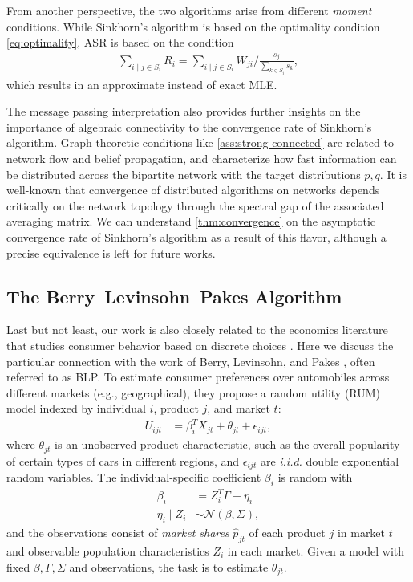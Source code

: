 From another perspective, the two algorithms arise from different \emph{moment} conditions. While Sinkhorn's algorithm is based on the optimality condition \eqref{eq:optimality}, ASR is based on the condition
\begin{align*}
    \sum_{i\mid j\in S_{i}} R_i = \sum_{i\mid j \in S_i}  W_{ji}/\frac{s_j}{\sum_{k\in S_{i}}s_{k}},
\end{align*}
which results in an approximate instead of exact MLE. 

The message passing interpretation also provides further insights on the importance of algebraic connectivity to the convergence rate of Sinkhorn's algorithm. Graph theoretic conditions like \cref{ass:strong-connected} are related to network flow and belief propagation, and characterize how fast information can be distributed across the bipartite network with the target distributions $p,q$. It is well-known that convergence of distributed algorithms on networks depends critically on the network topology through the spectral gap of the associated averaging matrix. We can understand \cref{thm:convergence} on the asymptotic convergence rate of Sinkhorn's algorithm as a result of this flavor, although a precise equivalence is left for future works. 

\subsection{The Berry--Levinsohn--Pakes Algorithm}
Last but not least, our work is also closely related to the economics literature that studies consumer behavior based on discrete choices \citep{mcfadden1973conditional,mcfadden1978modelling,mcfadden1981econometric,berry1995automobile}. Here we discuss the particular connection with the work of Berry,
Levinsohn, and Pakes \cite{berry1995automobile}, often referred to as BLP. To estimate consumer preferences over automobiles across different markets (e.g., geographical), they propose a random utility (RUM) model indexed by individual $i$, product
$j$, and market $t$:
\begin{align*}
U_{ijt} & =\beta_{i}^{T}X_{jt}+\theta_{jt}+\epsilon_{ijt},
\end{align*}
 where $\theta_{jt}$ is an unobserved product characteristic, such as the overall popularity of certain types of cars in different regions, and $\epsilon_{ijt}$
are \emph{i.i.d.} double exponential random variables.
The individual-specific coefficient $\beta_{i}$ is random with 
\begin{align*}
\beta_{i} & =Z_{i}^T\Gamma+\eta_{i}\\
\eta_{i}\mid Z_{i} & \sim\mathcal{N}(\beta,\Sigma),
\end{align*}
and the observations consist of \emph{market shares} $\hat{p}_{jt}$ of each
product $j$ in market $t$ and observable population characteristics $Z_{i}$ in each
market. Given a model with fixed $\beta,\Gamma,\Sigma$ and observations, the task is to estimate $\theta_{jt}$. 


